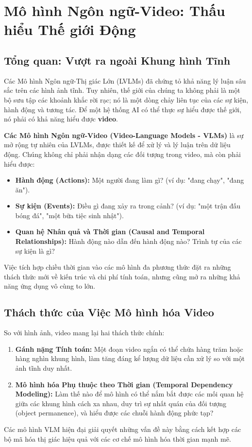 \section{Mô hình Ngôn ngữ-Video: Thấu hiểu Thế giới Động}
\label{sec:video_language_models}

\subsection{Tổng quan: Vượt ra ngoài Khung hình Tĩnh}
\label{subsec:vlm_overview}
Các Mô hình Ngôn ngữ-Thị giác Lớn (LVLMs) đã chứng tỏ khả năng lý luận sâu sắc trên các hình ảnh tĩnh. Tuy nhiên, thế giới của chúng ta không phải là một bộ sưu tập các khoảnh khắc rời rạc; nó là một dòng chảy liên tục của các sự kiện, hành động và tương tác. Để một hệ thống AI có thể thực sự hiểu được thế giới, nó phải có khả năng hiểu được \textbf{video}.

\textbf{Các Mô hình Ngôn ngữ-Video (Video-Language Models - VLMs)} là sự mở rộng tự nhiên của LVLMs, được thiết kế để xử lý và lý luận trên dữ liệu động. Chúng không chỉ phải nhận dạng các đối tượng trong video, mà còn phải hiểu được:
\begin{itemize}
	\item \textbf{Hành động (Actions):} Một người đang làm gì? (ví dụ: "đang chạy", "đang ăn").
	\item \textbf{Sự kiện (Events):} Điều gì đang xảy ra trong cảnh? (ví dụ: "một trận đấu bóng đá", "một bữa tiệc sinh nhật").
	\item \textbf{Quan hệ Nhân quả và Thời gian (Causal and Temporal Relationships):} Hành động nào dẫn đến hành động nào? Trình tự của các sự kiện là gì?
\end{itemize}
Việc tích hợp chiều thời gian vào các mô hình đa phương thức đặt ra những thách thức mới về kiến trúc và chi phí tính toán, nhưng cũng mở ra những khả năng ứng dụng vô cùng to lớn.

\subsection{Thách thức của Việc Mô hình hóa Video}
\label{subsec:video_modeling_challenges}
So với hình ảnh, video mang lại hai thách thức chính:
\begin{enumerate}
	\item \textbf{Gánh nặng Tính toán:} Một đoạn video ngắn có thể chứa hàng trăm hoặc hàng nghìn khung hình, làm tăng đáng kể lượng dữ liệu cần xử lý so với một ảnh tĩnh duy nhất.
	\item \textbf{Mô hình hóa Phụ thuộc theo Thời gian (Temporal Dependency Modeling):} Làm thế nào để mô hình có thể nắm bắt được các mối quan hệ giữa các khung hình cách xa nhau, duy trì sự nhất quán của đối tượng (object permanence), và hiểu được các chuỗi hành động phức tạp?
\end{enumerate}
Các mô hình VLM hiện đại giải quyết những vấn đề này bằng cách kết hợp các bộ mã hóa thị giác hiệu quả với các cơ chế mô hình hóa thời gian mạnh mẽ.

